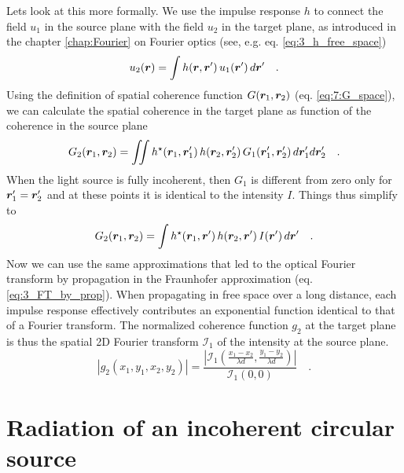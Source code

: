 Lets look at this more formally. We use the impulse response $h$ to connect the field $u_1$ in the source plane with the field $u_2$ in the target plane, as introduced in the chapter \ref{chap:Fourier} on Fourier optics (see, e.g. eq. \ref{eq:3_h_free_space})
\begin{equation}
    u_2(\boldsymbol{r}) = \int h(\boldsymbol{r}, \boldsymbol{r}') \, u_1(\boldsymbol{r}') \, d\boldsymbol{r}'  \quad .
\end{equation}
Using the definition of spatial coherence function $G(\boldsymbol{r}_1, \boldsymbol{r}_2)$ (eq. \ref{eq:7:G_space}), we can calculate the spatial coherence in the target plane as function of the coherence in the source plane
\begin{equation}
    G_2(\boldsymbol{r}_1, \boldsymbol{r}_2) = \iint  h^\star(\boldsymbol{r}_1, \boldsymbol{r}'_1) \,  h(\boldsymbol{r}_2, \boldsymbol{r}'_2) \,  G_1(\boldsymbol{r}'_1, \boldsymbol{r}'_2) \, d\boldsymbol{r}'_1  d\boldsymbol{r}'_2  \quad .
\end{equation}
When the light source is fully incoherent, then $G_1$ is different from zero only for $\boldsymbol{r}'_1 = \boldsymbol{r}'_2$ and at these points it is identical to the intensity $I$. Things thus simplify to 
\begin{equation}
    G_2(\boldsymbol{r}_1, \boldsymbol{r}_2) = \int  h^\star(\boldsymbol{r}_1, \boldsymbol{r}') \,  h(\boldsymbol{r}_2, \boldsymbol{r}') \,  I(\boldsymbol{r}') \, d\boldsymbol{r}'  \quad .
\end{equation}
Now we can use the same approximations that led to the optical Fourier transform by propagation in the Fraunhofer approximation (eq. \ref{eq:3_FT_by_prop}). When propagating in free space over a long distance, each impulse response effectively contributes an exponential function identical to that of a Fourier transform. The normalized coherence function $g_2$ at the target plane is thus the spatial 2D Fourier transform $\mathcal{I}_1$ of the intensity at the source plane.
\begin{equation}
    \left| g_2(x_1, y_1, x_2, y_2) \right| = \frac{\left| \mathcal{I}_1 \left( \frac{x_1 - x_2}{\lambda d}, \frac{y_1-y_2}{\lambda d} \right)  \right|}{\mathcal{I}_1 (0,0)}  \quad .
\end{equation}

\section{Radiation of an incoherent circular source}

